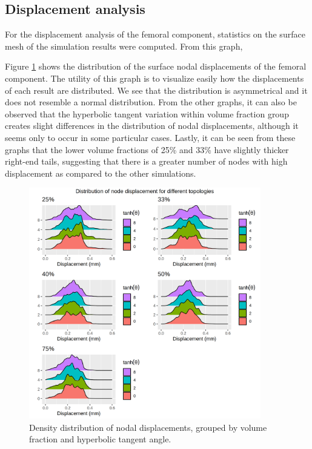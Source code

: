 \documentclass[../main.tex]{subfiles}
\begin{document}
\subsection{Displacement analysis}

For the displacement analysis of the femoral component, statistics on the surface mesh of the simulation results were computed. From this graph,  

Figure \ref{fig:disp_ridges} shows the distribution of the surface nodal displacements of the femoral component. The utility of this graph is to visualize easily how the displacements of each result are distributed. We see that the distribution is asymmetrical and it does not resemble a normal distribution. From the other graphs, it can also be observed that the hyperbolic tangent variation within volume fraction group creates slight differences in the distribution of nodal displacements, although it seems only to occur in some particular cases. Lastly, it can be seen from these graphs that the lower volume fractions of 25\% and 33\% have slightly thicker right-end tails, suggesting that there is a greater number of nodes with high displacement as compared to the other simulations.

\begin{figure}[h!]
  \centering
  \includegraphics[width=0.9\textwidth]{images/results/plots/femoral/displacement/disp_density_ridges.png}
  \caption{Density distribution of nodal displacements, grouped by volume fraction and hyperbolic tangent angle.}
  \label{fig:disp_ridges}
\end{figure}
\end{document}
